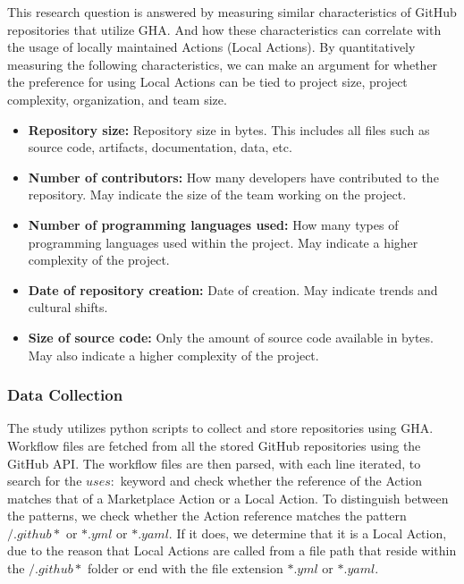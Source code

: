 \documentclass[conference]{IEEEtran}
\begin{document}
           This research question is answered by measuring similar characteristics of GitHub repositories that utilize GHA. And how these characteristics can correlate with the usage of locally maintained Actions (Local Actions). By quantitatively measuring the following characteristics, we can make an argument for whether the preference for using Local Actions can be tied to project size, project complexity, organization, and team size. \\
          \begin{itemize}
            \item \textbf{Repository size:} Repository size in bytes. This includes all files such as source code, artifacts, documentation, data, etc.
            \item \textbf{Number of contributors:} How many developers have contributed to the repository. May indicate the size of the team working on the project.
            \item	\textbf{Number of programming languages used:} How many types of programming languages used within the project. May indicate a higher complexity of the project.
            \item \textbf{Date of repository creation:} Date of creation. May indicate trends and cultural shifts.
            \item \textbf{Size of source code:} Only the amount of source code available in bytes. May also indicate a higher complexity of the project. \\
          \end{itemize}
          
          \subsubsection{\textbf{Data Collection}}

            The study utilizes python scripts\cite{Marof2024}  to collect and store repositories using GHA. Workflow files are fetched from all the stored GitHub repositories using the GitHub API.  The workflow files are then parsed, with each line iterated, to search for the $uses:$ keyword and check whether the reference of the Action matches that of a Marketplace Action or a Local Action. To distinguish between the patterns, we check whether the Action reference matches the pattern $/.github*$ or $*.yml$ or $*.yaml$. If it does, we determine that it is a Local Action, due to the reason that Local Actions are called from a file path that reside within the $/.github*$ folder or end with the file extension $*.yml$ or $*.yaml$.
\end{document}
